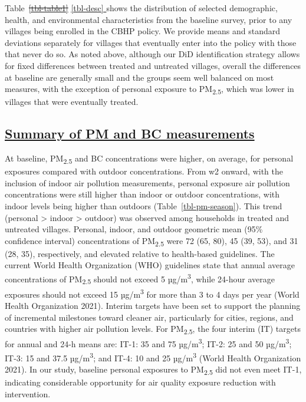 \documentclass[
  letterpaper,
  DIV=11,
  numbers=noendperiod]{scrartcl}
\providecommand{\DIFadd}[1]{{\protect\color{blue}\underline{#1}}} %
\providecommand{\DIFdel}[1]{{\protect\color{red}\sout{#1}}}                      %
\providecommand{\DIFaddbegin}{} %
\providecommand{\DIFaddend}{} %
\providecommand{\DIFdelbegin}{} %
\providecommand{\DIFdelend}{} %
\newcommand{\DIFscaledelfig}{0.5}
\newlength{\DIFdelgraphicswidth} %
\newlength{\DIFdelgraphicsheight} %
\newcommand{\DIFaddincludegraphics}[2][]{{\color{blue}\fbox{\DIFOincludegraphics[#1]{#2}}}} %
\newcommand{\DIFdelincludegraphics}[2][]{%
\sbox{\DIFdelgraphicsbox}{\DIFOincludegraphics[#1]{#2}}%
\settoboxwidth{\DIFdelgraphicswidth}{\DIFdelgraphicsbox} %
\settoboxtotalheight{\DIFdelgraphicsheight}{\DIFdelgraphicsbox} %
\scalebox{\DIFscaledelfig}{%
\parbox[b]{\DIFdelgraphicswidth}{\usebox{\DIFdelgraphicsbox}\\[-\baselineskip] \rule{\DIFdelgraphicswidth}{0em}}\llap{\resizebox{\DIFdelgraphicswidth}{\DIFdelgraphicsheight}{%
\setlength{\unitlength}{\DIFdelgraphicswidth}%
\begin{picture}(1,1)%
\thicklines\linethickness{2pt} %
{\color[rgb]{1,0,0}\put(0,0){\framebox(1,1){}}}%
{\color[rgb]{1,0,0}\put(0,0){\line( 1,1){1}}}%
{\color[rgb]{1,0,0}\put(0,1){\line(1,-1){1}}}%
\end{picture}%
}\hspace*{3pt}}} %
} %
\DeclareRobustCommand{\DIFaddbegin}{\DIFOaddbegin \let\includegraphics\DIFaddincludegraphics} %
\DeclareRobustCommand{\DIFaddend}{\DIFOaddend \let\includegraphics\DIFOincludegraphics} %
\DeclareRobustCommand{\DIFdelbegin}{\DIFOdelbegin \let\includegraphics\DIFdelincludegraphics} %
\DeclareRobustCommand{\DIFdelend}{\DIFOaddend \let\includegraphics\DIFOincludegraphics} %
\begin{document}
Table~\DIFdelbegin \DIFdel{\ref{tbl-table1} }\DIFdelend \DIFaddbegin \DIFadd{\ref{tbl-desc} }\DIFaddend shows the distribution of selected demographic,
health, and environmental characteristics from the baseline survey,
prior to any villages being enrolled in the CBHP policy. We provide
means and standard deviations separately for villages that eventually
enter into the policy with those that never do so. As noted above,
although our DiD identification strategy allows for fixed differences
between treated and untreated villages, overall the differences at
baseline are generally small and the groups seem well balanced on most
measures, with the exception of personal exposure to
PM\textsubscript{2.5}, which was lower in villages that were eventually
treated.

\DIFdelbegin %
\DIFdelend \DIFaddbegin \subsection{\DIFadd{Summary of PM and BC
measurements}}\label{summary-of-pm-and-bc-measurements}
\DIFaddend 

At baseline, PM\textsubscript{2.5} and BC concentrations were higher, on
average, for personal exposures compared with outdoor concentrations.
From w2 onward, with the inclusion of indoor air pollution measurements,
personal exposure air pollution concentrations were still higher than
indoor or outdoor concentrations, with indoor levels being higher than
outdoors (Table~\ref{tbl-pm-season}). This trend (personal
\textgreater{} indoor \textgreater{} outdoor) was observed among
households in treated and untreated villages. Personal, indoor, and
outdoor geometric mean (95\% confidence interval) concentrations of
PM\textsubscript{2.5} were 72 (65, 80), 45 (39, 53), and 31 (28, 35),
respectively, and elevated relative to health-based guidelines. The
current World Health Organization (WHO) guidelines state that annual
average concentrations of PM\textsubscript{2.5} should not exceed 5
µg/m\textsuperscript{3}, while 24-hour average exposures should not
exceed 15 µg/m\textsuperscript{3} for more than 3 to 4 days per year
(World Health Organization 2021). Interim targets have been set to
support the planning of incremental milestones toward cleaner air,
particularly for cities, regions, and countries with higher air
pollution levels. For PM\textsubscript{2.5}, the four interim (IT)
targets for annual and 24-h means are: IT-1: 35 and 75
µg/m\textsuperscript{3}; IT-2: 25 and 50 µg/m\textsuperscript{3}; IT-3:
15 and 37.5 µg/m\textsuperscript{3}; and IT-4: 10 and 25
µg/m\textsuperscript{3} (World Health Organization 2021). In our study,
baseline personal exposures to PM\textsubscript{2.5} did not even meet
IT-1, indicating considerable opportunity for air quality exposure
reduction with intervention.
\end{document}
